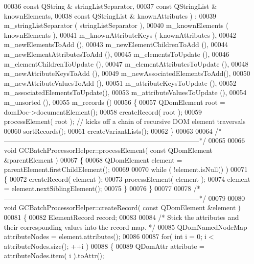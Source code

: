 \begin{DoxyCode}
00036                                                 \textcolor{keyword}{const} QString &
      stringListSeparator,
00037                                                 \textcolor{keyword}{const} QStringList &
      knownElements,
00038                                                 \textcolor{keyword}{const} QStringList &
      knownAttributes ) :
00039   m\_stringListSeparator       ( stringListSeparator ),
00040   m\_knownElements             ( knownElements ),
00041   m\_knownAttributeKeys        ( knownAttributes ),
00042   m\_newElementsToAdd          (),
00043   m\_newElementChildrenToAdd   (),
00044   m\_newElementAttributesToAdd (),
00045   m\_elementsToUpdate          (),
00046   m\_elementChildrenToUpdate   (),
00047   m\_elementAttributesToUpdate (),
00048   m\_newAttributeKeysToAdd     (),
00049   m\_newAssociatedElementsToAdd(),
00050   m\_newAttributeValuesToAdd   (),
00051   m\_attributeKeysToUpdate     (),
00052   m\_associatedElementsToUpdate(),
00053   m\_attributeValuesToUpdate   (),
00054   m\_unsorted                  (),
00055   m\_records                   ()
00056 \{
00057   QDomElement root = domDoc->documentElement();
00058   createRecord( root );
00059   processElement( root );   \textcolor{comment}{// kicks off a chain of recursive DOM element
       traversals}
00060   sortRecords();
00061   createVariantLists();
00062 \}
00063 
00064 \textcolor{comment}{/*
      --------------------------------------------------------------------------------------*/}
00065 
00066 \textcolor{keywordtype}{void} GCBatchProcessorHelper::processElement( \textcolor{keyword}{const} QDomElement &parentElement )
00067 \{
00068   QDomElement element = parentElement.firstChildElement();
00069 
00070   \textcolor{keywordflow}{while} ( !element.isNull() )
00071   \{
00072     createRecord( element );
00073     processElement( element );
00074     element = element.nextSiblingElement();
00075   \}
00076 \}
00077 
00078 \textcolor{comment}{/*
      --------------------------------------------------------------------------------------*/}
00079 
00080 \textcolor{keywordtype}{void} GCBatchProcessorHelper::createRecord( \textcolor{keyword}{const} QDomElement &element )
00081 \{
00082   ElementRecord record;
00083 
00084   \textcolor{comment}{/* Stick the attributes and their corresponding values into the record map. 
      */}
00085   QDomNamedNodeMap attributeNodes = element.attributes();
00086 
00087   \textcolor{keywordflow}{for}( \textcolor{keywordtype}{int} i = 0; i < attributeNodes.size(); ++i )
00088   \{
00089     QDomAttr attribute = attributeNodes.item( i ).toAttr();

\end{DoxyCode}

